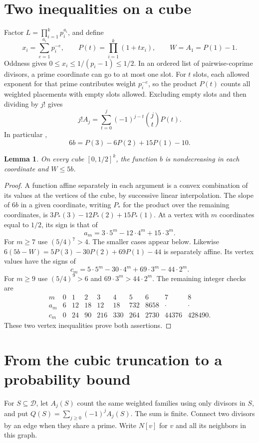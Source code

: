 \documentclass[11pt]{article}
\newtheorem{lemma}[theorem]{Lemma}
\newcommand{\D}{\mathcal D}
\begin{document}
\section{Two inequalities on a cube}
Factor \(L=\prod_{i=1}^k p_i^{a_i}\), and define
\[
 x_i=\sum_{e=1}^{a_i}p_i^{-e},\qquad P(t)=\prod_{i=1}^k(1+t x_i),
 \qquad W=A_1=P(1)-1 .
\]
Oddness gives \(0\leq x_i\leq 1/(p_i-1)\leq 1/2\).
In an ordered list of pairwise-coprime divisors, a prime coordinate
can go to at most one slot. For \(t\) slots, each allowed exponent for
that prime contributes weight \(p_i^{-e}\), so the product \(P(t)\)
counts all weighted placements with empty slots allowed.
Excluding empty slots and then dividing by \(j!\) gives
\[
 j! A_j=\sum_{t=0}^{j}(-1)^{j-t}\binom jt P(t).
\]
In particular \cite[eq.~(5.2)]{toker},
\begin{equation}\label{eq:b}
 6b=P(3)-6P(2)+15P(1)-10 .
\end{equation}

\begin{lemma}\label{lem:cube}
On every cube \([0,1/2]^k\), the function \(b\) is nondecreasing in each
coordinate and \(W\leq 5b\).
\end{lemma}
\begin{proof}
A function affine separately in each argument is a convex combination
of its values at the vertices of the cube, by successive linear
interpolation. The slope of \(6b\) in a given coordinate, writing \(P_*\)
for the product over the remaining coordinates, is
\(3P_*(3)-12P_*(2)+15P_*(1)\).
At a vertex with \(m\) coordinates equal to \(1/2\), its sign is that of
\[
 a_m=3\cdot 5^m-12\cdot4^m+15\cdot3^m.
\]
For \(m\ge7\) use \((5/4)^7>4\). The smaller cases appear below.
Likewise \(6(5b-W)=5P(3)-30P(2)+69P(1)-44\) is separately affine.
Its vertex values have the signs of
\[
 c_m=5\cdot5^m-30\cdot4^m+69\cdot3^m-44\cdot2^m .
\]
For \(m\ge9\) use \((5/4)^9>6\) and \(69\cdot3^m>44\cdot2^m\).
The remaining integer checks are
\[
\begin{array}{c|rrrrrrrrr}
m   &0&1&2&3&4&5&6&7&8\\\hline
a_m &6&12&18&12&18&732&8658&\cdot&\cdot\\
c_m &0&24&90&216&330&264&2730&44376&428490 .
\end{array}
\]
These two vertex inequalities prove both assertions.
\end{proof}

\section{From the cubic truncation to a probability bound}
For \(S\subseteq\D\), let \(A_j(S)\) count the same weighted families
using only divisors in \(S\), and put \(Q(S)=\sum_{j\ge0}(-1)^j A_j(S)\).
The sum is finite. Connect two divisors by an edge when they share a
prime. Write \(N[v]\) for \(v\) and all its neighbors in this graph.
\end{document}
